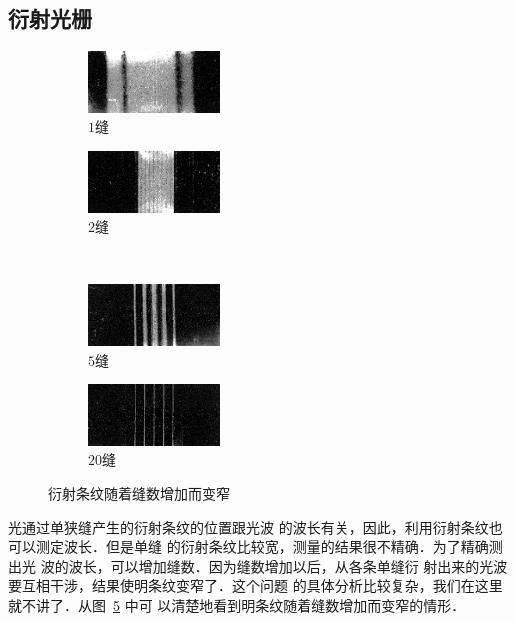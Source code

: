 \subsection{衍射光栅}
\begin{figure}[htbp]
    \centering
    \begin{subfigure}{0.4\linewidth}
        \centering
        \includegraphics[width=3.5cm]{fig/C/6-9a.png}
        \caption{$1$缝}\label{fig_C_6-9a}
    \end{subfigure}
    \hfil
    \begin{subfigure}{0.4\linewidth}
        \centering
        \includegraphics[width=3.5cm]{fig/C/6-9b.png}
        \caption{$2$缝}\label{fig_C_6-9b}
    \end{subfigure}
    \\
    \begin{subfigure}{0.4\linewidth}
        \centering
        \includegraphics[width=3.5cm]{fig/C/6-9c.png}
        \caption{$5$缝}\label{fig_C_6-9c}
    \end{subfigure}
    \hfil
    \begin{subfigure}{0.4\linewidth}
        \centering
        \includegraphics[width=3.5cm]{fig/C/6-9d.png}
        \caption{$20$缝}\label{fig_C_6-9d}
    \end{subfigure}
    \caption{衍射条纹随着缝数增加而变窄}\label{fig_C_6-9}
\end{figure}

光通过单狭缝产生的衍射条纹的位置跟光波
的波长有关，因此，利用衍射条纹也可以测定波长．但是单缝
的衍射条纹比较宽，测量的结果很不精确．为了精确测出光
波的波长，可以增加缝数．因为缝数增加以后，从各条单缝衍
射出来的光波要互相干涉，结果使明条纹变窄了．这个问题
的具体分析比较复杂，我们在这里就不讲了．从图~\ref{fig_C_6-9} 中可
以清楚地看到明条纹随着缝数增加而变窄的情形．


